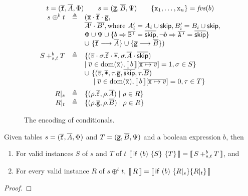 \begin{figure}[tpb]
  \[\begin{array}{rcl}
      \multicolumn 3 c {t = (\vec{\var f}, \vec A, \Phi) \qquad s = (\vec{\var g}, \vec B, \Psi) \qquad \{\var x_1, \ldots, \var x_n\} = \fvs(b)}\\
      s \mathrel{\oplus^b} t
      & \triangleq
      & (\vec{\var x}\cdot\vec{\var f}\cdot \vec{\var g},\\
      && \vec{A'}\cdot\vec{B'}, \text{where}~ A'_i = A_i \cup \SKIP, B'_i = B_i \cup\SKIP, \\
      && \Phi \cup \Psi \cup \{b \Rightarrow \vec{\var{B'}} = \overrightarrow \SKIP, \neg b \Rightarrow \vec {\var{A'}} = \overrightarrow\SKIP\}\\
      && \cup~\{\vec{\var f} \longrightarrow \vec A\} \cup
         \{\vec{\var g} \longrightarrow \vec B\}
         )\\[.5em]
      S +^b_{s,t} T
      & \triangleq
      & \{(\vec v\cdot \sigma.\vec{\var{f}} \cdot \vec{\var *}, \sigma.\vec A \cdot \overrightarrow{\SKIP})\\
      &&\mid \vec v \in \dom(\vec{\var x}), \bracbb{b}[\overline{\var x \mapsto v}] = \TRUE, \sigma \in S \} \\
      && \cup~\{(\vec v, \vec{\var *}, \tau.\vec{\var{g}}, \overrightarrow{\SKIP}, \tau.\vec B) \\
      && \phantom{\cup}~\mid \vec v \in \dom(\vec{\var x}), \bracbb{b}[\overline{\var x \mapsto v}] = \FALSE, \tau \in T \}\\[.5em]
      R|_s
      &\triangleq
      & \{(\rho.\vec{\var f},\rho.{\vec A}) \mid  \rho \in R\}\\
      R|_t
      & \triangleq
      & \{(\rho.\vec{\var g}, \rho.\vec B) \mid \rho \in R\}
    \end{array}
  \]
  \caption{The encoding of conditionals. }
  \label{fig:conditionals}
\end{figure}

\begin{theorem}
  Given tables $s = (\overline{\texttt{f}}, \overline{A}, \Phi)$ and
  $T = (\overline{\texttt{g}}, \overline{B}, \Psi)$ and a boolean expression $b$,
  then
  \begin{enumerate}
  \item For valid instances $S$ of $s$ and $T$ of $t$
    $\llbracket\,\mathsf{if}~(b)~\{S\}~\{T\}\,\rrbracket = \llbracket\,S +_{s,t}^b T\,\rrbracket$, and
  \item For every valid instance $R$ of $s \oplus^b t$,
    $\llbracket\,R\,\rrbracket = \llbracket\,\mathsf{if}~(b)~\{R|_s\} \{R|_t\}\,\rrbracket$
  \end{enumerate}
\end{theorem}
\begin{proof}
\end{proof}


